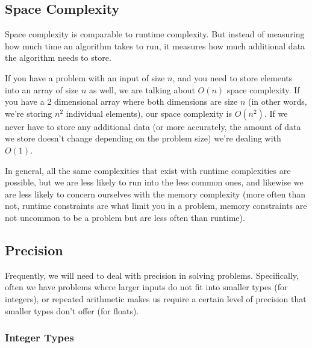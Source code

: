\subsection{Space Complexity}

Space complexity is comparable to runtime complexity. But instead of measuring how much time an algorithm takes to run, it measures how much additional data the algorithm needs to store.

If you have a problem with an input of size $n$, and you need to store elements into an array of size $n$ as well, we are talking about $O(n)$ space complexity. If you have a 2 dimensional array where both dimensions are size $n$ (in other words, we're storing $n^2$ individual elements), our space complexity is $O(n^2)$. If we never have to store any additional data (or more accurately, the amount of data we store doesn't change depending on the problem size) we're dealing with $O(1)$.

In general, all the same complexities that exist with runtime complexities are possible, but we are less likely to run into the less common ones, and likewise we are less likely to concern ourselves with the memory complexity (more often than not, runtime constraints are what limit you in a problem, memory constraints are not uncommon to be a problem but are less often than runtime).

\subsection{Precision}

Frequently, we will need to deal with precision in solving problems. Specifically, often we have problems where larger inputs do not fit into smaller types (for integers), or repeated arithmetic makes us require a certain level of precision that smaller types don't offer (for floats).

\subsubsection{Integer Types}

    

